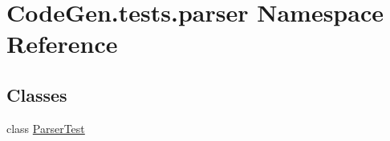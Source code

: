 \hypertarget{namespaceCodeGen_1_1tests_1_1parser}{}\section{Code\+Gen.\+tests.\+parser Namespace Reference}
\label{namespaceCodeGen_1_1tests_1_1parser}
\subsection*{Classes}
\begin{DoxyCompactItemize}
\item 
class \mbox{\hyperlink{classCodeGen_1_1tests_1_1parser_1_1ParserTest}{Parser\+Test}}
\end{DoxyCompactItemize}
